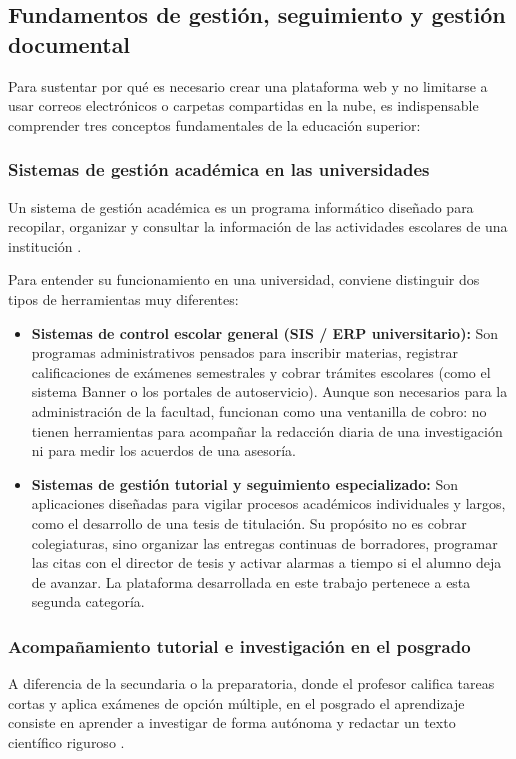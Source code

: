 \subsection{Fundamentos de gestión, seguimiento y gestión documental} 
\label{subsec:fundamentos_gestion}

Para sustentar por qué es necesario crear una plataforma web y no limitarse a usar correos electrónicos o carpetas compartidas en la nube, es indispensable comprender tres conceptos fundamentales de la educación superior:

\subsubsection{Sistemas de gestión académica en las universidades}
Un sistema de gestión académica es un programa informático diseñado para recopilar, organizar y consultar la información de las actividades escolares de una institución \parencite{laudon2020management}. 

Para entender su funcionamiento en una universidad, conviene distinguir dos tipos de herramientas muy diferentes:
\begin{itemize}
    \item \textbf{Sistemas de control escolar general (SIS / ERP universitario):} Son programas administrativos pensados para inscribir materias, registrar calificaciones de exámenes semestrales y cobrar trámites escolares (como el sistema Banner o los portales de autoservicio). Aunque son necesarios para la administración de la facultad, funcionan como una ventanilla de cobro: no tienen herramientas para acompañar la redacción diaria de una investigación ni para medir los acuerdos de una asesoría.
    \item \textbf{Sistemas de gestión tutorial y seguimiento especializado:} Son aplicaciones diseñadas para vigilar procesos académicos individuales y largos, como el desarrollo de una tesis de titulación. Su propósito no es cobrar colegiaturas, sino organizar las entregas continuas de borradores, programar las citas con el director de tesis y activar alarmas a tiempo si el alumno deja de avanzar. La plataforma desarrollada en este trabajo pertenece a esta segunda categoría.
\end{itemize}

\subsubsection{Acompañamiento tutorial e investigación en el posgrado}
A diferencia de la secundaria o la preparatoria, donde el profesor califica tareas cortas y aplica exámenes de opción múltiple, en el posgrado el aprendizaje consiste en aprender a investigar de forma autónoma y redactar un texto científico riguroso \parencite{lee2012successful}.

